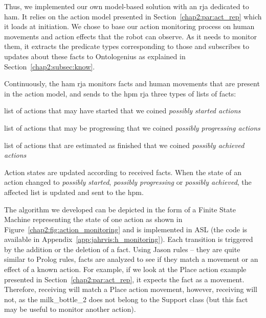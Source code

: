 \documentclass[a4paper,11pt,twoside]{StyleThese}
\begin{document}
Thus, we implemented our own model-based solution with an \acrshort{rja} dedicated to \acrfull{ham}. It relies on the action model presented in Section~\ref{chap2:par:act_rep} which it loads at initiation. We chose to base our action monitoring process on human movements and action effects that the robot can observe. As it needs to monitor them, it extracts the predicate types corresponding to those and subscribes to updates about these facts to Ontologenius as explained in Section~\ref{chap2:subsec:know}. 

Continuously, the \acrshort{ham} \acrshort{rja} monitors facts and human movements that are present in the action model, and sends to the \acrfull{hpm} \acrshort{rja} three types of lists of facts: 
\begin{bulletList}
	\item list of actions that may have started that we coined \emph{possibly started actions}
	\item list of actions that may be progressing that we coined \emph{possibly progressing actions}
	\item list of actions that are estimated as finished that we coined \emph{possibly achieved actions} 
\end{bulletList}

Action states are updated according to received facts. When the state of an action changed to \emph{possibly started}, \emph{possibly progressing} or \emph{possibly achieved}, the affected list is updated and sent to the \acrshort{hpm}. 

The algorithm we developed can be depicted in the form of a Finite State Machine representing the state of one action as shown in Figure~\ref{chap2:fig:action_monitoring} and is implemented in ASL (the code is available in Appendix~\ref{app:jahrvis:h_monitoring}). Each transition is triggered by the addition or the deletion of a fact. Using Jason rules -- they are quite similar to Prolog rules, facts are analyzed to see if they match a movement or an effect of a known action. For example, if we look at the Place action example presented in Section~\ref{chap2:par:act_rep}, it expects the fact  as a movement. Therefore, receiving  will match a Place action movement, however, receiving  will not, as the milk\_bottle\_2 does not belong to the Support class (but this fact may be useful to monitor another action).
 
\end{document}
